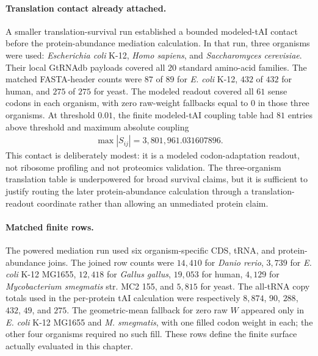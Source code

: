 \paragraph{Translation contact already attached.}
A smaller translation-survival run established a bounded modeled-tAI contact before the protein-abundance mediation calculation.  In that run, three organisms were used: \emph{Escherichia coli} K-12, \emph{Homo sapiens}, and \emph{Saccharomyces cerevisiae}.  Their local GtRNAdb payloads covered all $20$ standard amino-acid families.  The matched FASTA-header counts were $87$ of $89$ for \emph{E. coli} K-12, $432$ of $432$ for human, and $275$ of $275$ for yeast.  The modeled readout covered all $61$ sense codons in each organism, with zero raw-weight fallbacks equal to $0$ in those three organisms.  At threshold $0.01$, the finite modeled-tAI coupling table had $81$ entries above threshold and maximum absolute coupling
$$
\begin{aligned}
\max |S_{ij}|=3{,}801{,}961.031607896.
\end{aligned}
$$
This contact is deliberately modest: it is a modeled codon-adaptation readout, not ribosome profiling and not proteomics validation.  The three-organism translation table is underpowered for broad survival claims, but it is sufficient to justify routing the later protein-abundance calculation through a translation-readout coordinate rather than allowing an unmediated protein claim.

\paragraph{Matched finite rows.}
The powered mediation run used six organism-specific CDS, tRNA, and protein-abundance joins.  The joined row counts were $14{,}410$ for \emph{Danio rerio}, $3{,}739$ for \emph{E. coli} K-12 MG1655, $12{,}418$ for \emph{Gallus gallus}, $19{,}053$ for human, $4{,}129$ for \emph{Mycobacterium smegmatis} str. MC2 155, and $5{,}815$ for yeast.  The all-tRNA copy totals used in the per-protein tAI calculation were respectively $8{,}874$, $90$, $288$, $432$, $49$, and $275$.  The geometric-mean fallback for zero raw $W$ appeared only in \emph{E. coli} K-12 MG1655 and \emph{M. smegmatis}, with one filled codon weight in each; the other four organisms required no such fill.  These rows define the finite surface actually evaluated in this chapter.

